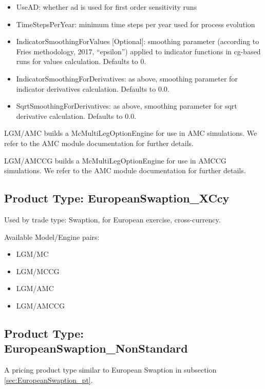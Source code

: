 \begin{itemize}
\item UseAD: whether ad is used for first order sensitivity runs
\item TimeStepsPerYear: minimum time steps per year used for process evolution
\item IndicatorSmoothingForValues [Optional]: smoothing parameter (according to Fries methodology, 2017, ``epsilon'')
  applied to indicator functions in cg-based runs for values calculation. Defaults to $0$.
\item IndicatorSmoothingForDerivatives: as above, smoothing parameter for indicator derivatives calculation. Defaults to $0.0$.
\item SqrtSmoothingForDerivatives: as above, smoothing parameter for sqrt derivative calculation. Defaults to $0.0$.
\end{itemize}

LGM/AMC builds a McMultiLegOptionEngine for use in AMC simulations. We refer to the AMC module documentation for further
details.

LGM/AMCCG builds a McMultiLegOptionEngine for use in AMCCG simulations. We refer to the AMC module documentation for
further details.

\subsection{Product Type: EuropeanSwaption\_XCcy}
\label{sec:EuropeanSwaption_XCcy_pt}
Used by trade type: Swaption, for European exercise, cross-currency.

Available Model/Engine pairs:

\begin{itemize}
\item LGM/MC
\item LGM/MCCG
\item LGM/AMC
\item LGM/AMCCG
\end{itemize}

\subsection{Product Type: EuropeanSwaption\_NonStandard}
\label{sec:EuropeanSwaption_ns_pt}
A pricing product type similar to European Swaption in subsection \ref{sec:EuropeanSwaption_pt}.

